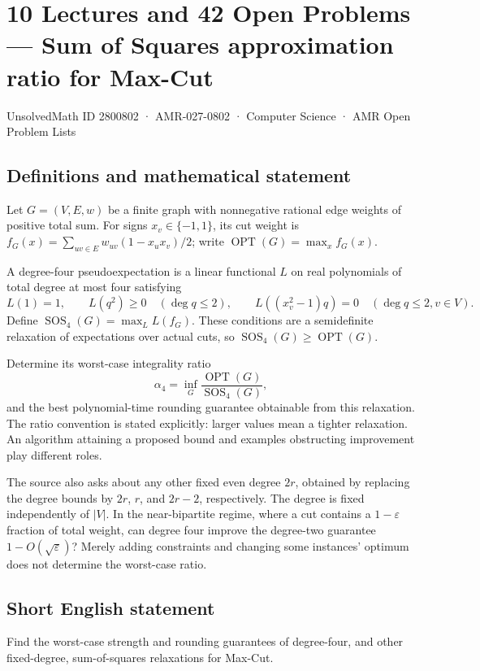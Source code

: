 \documentclass[11pt,a4paper]{article}
\begin{document}
\section*{10 Lectures and 42 Open Problems — Sum of Squares approximation ratio for Max-Cut}\label{2800802}
{\small UnsolvedMath ID 2800802 · AMR-027-0802 · Computer Science · AMR Open Problem Lists}
\subsection{Definitions and mathematical statement}
Let $G=(V,E,w)$ be a finite graph with nonnegative rational edge weights
of positive total sum. For signs $x_v\in\{-1,1\}$, its cut weight is
$f_G(x)=\sum_{uv\in E}w_{uv}(1-x_ux_v)/2$; write
$\operatorname{OPT}(G)=\max_x f_G(x)$.

A degree-four pseudoexpectation is a linear functional $L$ on real
polynomials of total degree at most four satisfying
\[
 L(1)=1,\qquad L(q^2)\ge0\quad(\deg q\le2),\qquad
 L((x_v^2-1)q)=0\quad(\deg q\le2, v\in V).
\]
Define $\operatorname{SOS}_4(G)=\max_L L(f_G)$. These conditions are
a semidefinite relaxation of expectations over actual cuts, so
$\operatorname{SOS}_4(G)\ge\operatorname{OPT}(G)$.

Determine its worst-case integrality ratio
\[
       \alpha_4=\inf_G
             \frac{\operatorname{OPT}(G)}{\operatorname{SOS}_4(G)},
\]
and the best polynomial-time rounding guarantee obtainable from this
relaxation. The ratio convention is stated explicitly: larger values
mean a tighter relaxation. An algorithm attaining a proposed bound
and examples obstructing improvement play different roles.

The source also asks about any other fixed even degree $2r$, obtained
by replacing the degree bounds by $2r$, $r$, and $2r-2$, respectively.
The degree is fixed independently of $|V|$. In the near-bipartite
regime, where a cut contains a $1-\varepsilon$ fraction of total
weight, can degree four improve the degree-two guarantee
$1-O(\sqrt\varepsilon)$? Merely adding constraints and changing some
instances' optimum does not determine the worst-case ratio.
\subsection{Short English statement}
Find the worst-case strength and rounding guarantees of degree-four, and other fixed-degree, sum-of-squares relaxations for Max-Cut.
\end{document}
